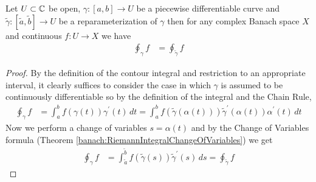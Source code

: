 \begin{prop}\label{banach:ContourIntegralParameterizationIndependence}Let $U \subset \mathbb{C}$ be open, $\gamma : [a,b] \to U$ be a piecewise differentiable curve and $\tilde{\gamma} : [\tilde{a}, \tilde{b}] \to U$ be a reparameterization of $\gamma$ then for any complex Banach space $X$ and continuous $f : U \to X$ we have 
\begin{align*}
\oint_{\gamma} f &= \oint_{\tilde{\gamma}} f
\end{align*}
\end{prop}
\begin{proof}
By the definition of the contour integral and restriction to an appropriate interval, it clearly suffices to consider the case in which $\gamma$ is assumed to be continuously differentiable so by the definition of the integral and the Chain Rule,
\begin{align*}
\oint_\gamma f &= \int_a^b f(\gamma(t)) \gamma^\prime(t) \, dt = \int_a^b f(\tilde{\gamma}(\alpha(t) ))  \tilde{\gamma}^\prime(\alpha(t)) \alpha^\prime(t) \, dt
\end{align*}
Now we perform a change of variables $s = \alpha(t)$ and by the Change of Variables formula (Theorem \ref{banach:RiemannIntegralChangeOfVariables}) we get
\begin{align*}
\oint_\gamma f &= \int_{\tilde{a}}^{\tilde{b}} f(\tilde{\gamma}(s)) \tilde{\gamma}^\prime(s) \, ds = \oint_{\tilde{\gamma}} f
\end{align*}
\end{proof}

